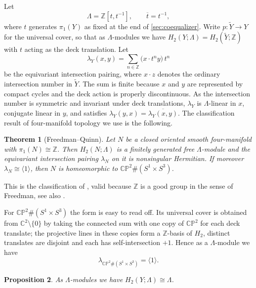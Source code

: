 \documentclass[11pt]{amsart}
\newtheorem{theorem}{Theorem}[section]
\newtheorem{proposition}[theorem]{Proposition}
\theoremstyle{definition}
\theoremstyle{remark}
\newcommand{\Z}{\mathbb Z}
\newcommand{\C}{\mathbb C}
\newcommand{\CP}{\mathbb{CP}}
\begin{document}
Let
\[
 \Lambda=\Z[t,t^{-1}],\qquad \overline t=t^{-1},
\]
where $t$ generates $\pi_1(Y)$ as fixed at the end of
\cref{sec:coequalizer}.  Write $p\colon \widetilde Y\to Y$ for
the universal cover, so that as $\Lambda$-modules we have
$H_2(Y;\Lambda)=H_2(\widetilde Y;\Z)$ with $t$ acting as the deck
translation. Let
\begin{equation}\label{eq:lambda-def}
 \lambda_Y(x,y)=\sum_{n\in\Z}\bigl(x\cdot t^ny\bigr)\,t^n
\end{equation}
be the equivariant intersection pairing, where $x\cdot z$ denotes the
ordinary intersection number in $\widetilde Y$.  The sum is finite because
$x$ and $y$ are represented by compact cycles and the deck action is properly
discontinuous.  As the intersection number is symmetric and invariant under
deck translations, $\lambda_Y$ is $\Lambda$-linear in $x$, conjugate linear
in $y$, and satisfies $\lambda_Y(y,x)=\overline{\lambda_Y(x,y)}$.  The
classification result of four-manifold topology we use is the following.


\begin{theorem}[Freedman--Quinn]\label{thm:FQ}
Let $N$ be a closed oriented smooth four-manifold with $\pi_1(N)\cong\Z$.
Then $H_2(N;\Lambda)$ is a finitely generated free $\Lambda$-module and the
equivariant intersection pairing $\lambda_N$ on it is nonsingular Hermitian.
If moreover $\lambda_N\cong\langle1\rangle$, then $N$ is homeomorphic to
$\CP^2\#(S^1\times S^3)$.
\end{theorem}

This is the classification of \cite[Chapter~10]{FQ}, valid because $\Z$ is a
good group in the sense of Freedman, see also 
\cite[Theorem~3.1]{HambletonSurvey}.

For $\CP^2\#(S^1\times S^3)$ the form is easy to read off.  Its
universal cover is obtained from $\C^2\setminus\{0\}$
by taking the connected sum with one copy of 
$\CP^2$ for each deck translate;
the projective lines in these copies form a $\Z$-basis of $H_2$,
distinct translates are disjoint and each has self-intersection $+1$.  Hence
as a $\Lambda$-module we have
\begin{equation}\label{eq:lambda-model}
 \lambda_{\CP^2\#(S^1\times S^3)}=\langle 1\rangle .
\end{equation}

\begin{proposition}\label{prop:rank-one}
As $\Lambda$-modules we have $H_2(Y;\Lambda)\cong\Lambda$.
\end{proposition}
\end{document}
